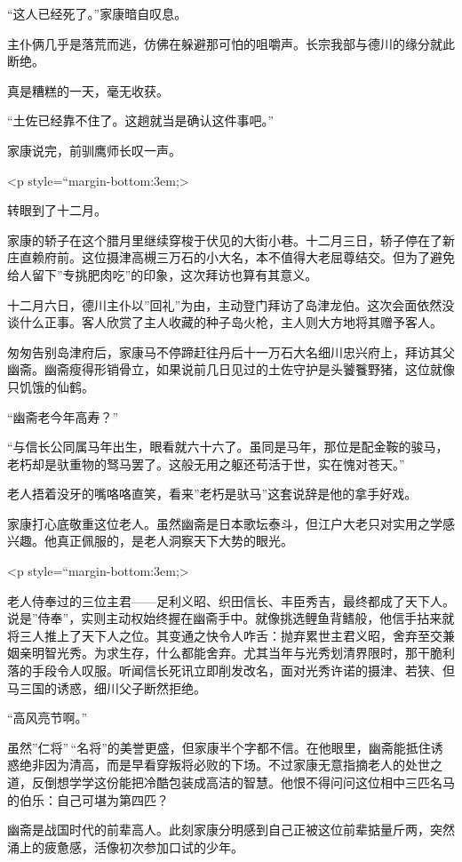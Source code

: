 \documentclass[
]{book}
\begin{document}
``这人已经死了。''家康暗自叹息。

主仆俩几乎是落荒而逃，仿佛在躲避那可怕的咀嚼声。长宗我部与德川的缘分就此断绝。

真是糟糕的一天，毫无收获。

``土佐已经靠不住了。这趟就当是确认这件事吧。''

家康说完，前驯鹰师长叹一声。

\textless p style=``margin-bottom:3em;\textgreater{}

转眼到了十二月。

家康的轿子在这个腊月里继续穿梭于伏见的大街小巷。十二月三日，轿子停在了新庄直赖府前。这位摄津高槻三万石的小大名，本不值得大老屈尊结交。但为了避免给人留下''专挑肥肉吃''的印象，这次拜访也算有其意义。

十二月六日，德川主仆以''回礼''为由，主动登门拜访了岛津龙伯。这次会面依然没谈什么正事。客人欣赏了主人收藏的种子岛火枪，主人则大方地将其赠予客人。

匆匆告别岛津府后，家康马不停蹄赶往丹后十一万石大名细川忠兴府上，拜访其父幽斋。幽斋瘦得形销骨立，如果说前几日见过的土佐守护是头饕餮野猪，这位就像只饥饿的仙鹤。

``幽斋老今年高寿？''

``与信长公同属马年出生，眼看就六十六了。虽同是马年，那位是配金鞍的骏马，老朽却是驮重物的驽马罢了。这般无用之躯还苟活于世，实在愧对苍天。''

老人捂着没牙的嘴咯咯直笑，看来''老朽是驮马''这套说辞是他的拿手好戏。

家康打心底敬重这位老人。虽然幽斋是日本歌坛泰斗，但江户大老只对实用之学感兴趣。他真正佩服的，是老人洞察天下大势的眼光。

\textless p style=``margin-bottom:3em;\textgreater{}

老人侍奉过的三位主君------足利义昭、织田信长、丰臣秀吉，最终都成了天下人。说是''侍奉''，实则主动权始终握在幽斋手中。就像挑选鲤鱼背鳍般，他信手拈来就将三人推上了天下人之位。其变通之快令人咋舌：抛弃累世主君义昭，舍弃至交兼姻亲明智光秀。为求生存，什么都能舍弃。尤其当年与光秀划清界限时，那干脆利落的手段令人叹服。听闻信长死讯立即削发改名，面对光秀许诺的摄津、若狭、但马三国的诱惑，细川父子断然拒绝。

``高风亮节啊。''

虽然''仁将''\,``名将''的美誉更盛，但家康半个字都不信。在他眼里，幽斋能抵住诱惑绝非因为清高，而是早看穿叛将必败的下场。不过家康无意指摘老人的处世之道，反倒想学学这份能把冷酷包装成高洁的智慧。他恨不得问问这位相中三匹名马的伯乐：自己可堪为第四匹？

幽斋是战国时代的前辈高人。此刻家康分明感到自己正被这位前辈掂量斤两，突然涌上的疲惫感，活像初次参加口试的少年。
\end{document}
